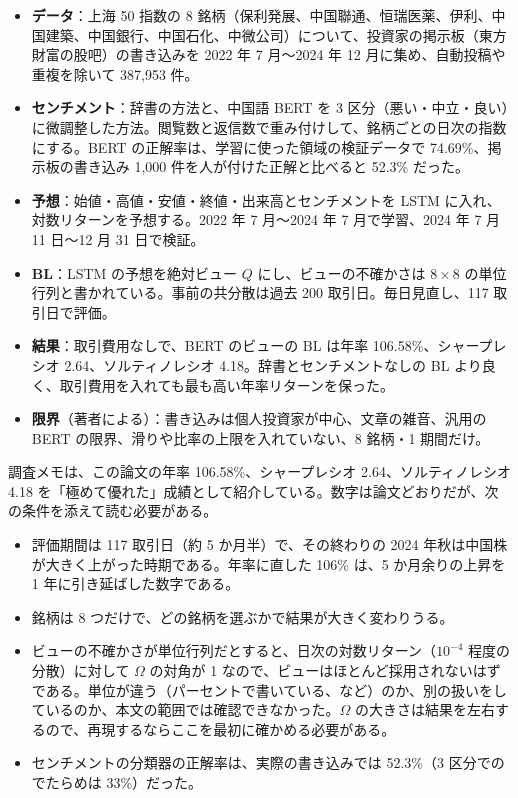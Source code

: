 \begin{paperbox}
\begin{itemize}
\item \textbf{データ}：上海 50 指数の 8 銘柄（保利発展、中国聯通、恒瑞医薬、伊利、中国建築、中国銀行、中国石化、中微公司）について、投資家の掲示板（東方財富の股吧）の書き込みを 2022 年 7 月〜2024 年 12 月に集め、自動投稿や重複を除いて 387,953 件。
\item \textbf{センチメント}：辞書の方法と、中国語 BERT を 3 区分（悪い・中立・良い）に微調整した方法。閲覧数と返信数で重み付けして、銘柄ごとの日次の指数にする。BERT の正解率は、学習に使った領域の検証データで 74.69\%、掲示板の書き込み 1,000 件を人が付けた正解と比べると 52.3\% だった。
\item \textbf{予想}：始値・高値・安値・終値・出来高とセンチメントを LSTM に入れ、対数リターンを予想する。2022 年 7 月〜2024 年 7 月で学習、2024 年 7 月 11 日〜12 月 31 日で検証。
\item \textbf{BL}：LSTM の予想を絶対ビュー $Q$ にし、ビューの不確かさは $8\times8$ の単位行列と書かれている。事前の共分散は過去 200 取引日。毎日見直し、117 取引日で評価。
\item \textbf{結果}：取引費用なしで、BERT のビューの BL は年率 106.58\%、シャープレシオ 2.64、ソルティノレシオ 4.18。辞書とセンチメントなしの BL より良く、取引費用を入れても最も高い年率リターンを保った。
\item \textbf{限界}（著者による）：書き込みは個人投資家が中心、文章の雑音、汎用の BERT の限界、滑りや比率の上限を入れていない、8 銘柄・1 期間だけ。
\end{itemize}
\end{paperbox}

調査メモは、この論文の年率 106.58\%、シャープレシオ 2.64、ソルティノレシオ 4.18 を「極めて優れた」成績として紹介している。数字は論文どおりだが、次の条件を添えて読む必要がある。

\begin{itemize}
\item 評価期間は 117 取引日（約 5 か月半）で、その終わりの 2024 年秋は中国株が大きく上がった時期である。年率に直した 106\% は、5 か月余りの上昇を 1 年に引き延ばした数字である。
\item 銘柄は 8 つだけで、どの銘柄を選ぶかで結果が大きく変わりうる。
\item ビューの不確かさが単位行列だとすると、日次の対数リターン（$10^{-4}$ 程度の分散）に対して $\Omega$ の対角が 1 なので、ビューはほとんど採用されないはずである。単位が違う（パーセントで書いている、など）のか、別の扱いをしているのか、本文の範囲では確認できなかった。$\Omega$ の大きさは結果を左右するので、再現するならここを最初に確かめる必要がある。
\item センチメントの分類器の正解率は、実際の書き込みでは 52.3\%（3 区分でのでたらめは 33\%）だった。
\end{itemize}

